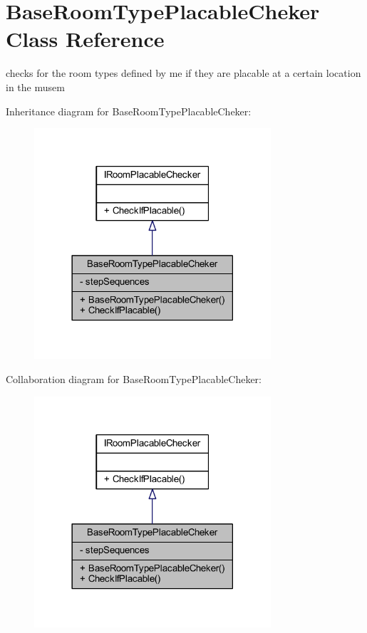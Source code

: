 \hypertarget{class_base_room_type_placable_cheker}{}\section{Base\+Room\+Type\+Placable\+Cheker Class Reference}
\label{class_base_room_type_placable_cheker}


checks for the room types defined by me if they are placable at a certain location in the musem  




Inheritance diagram for Base\+Room\+Type\+Placable\+Cheker\+:
\nopagebreak
\begin{figure}[H]
\begin{center}
\leavevmode
\includegraphics[width=249pt]{class_base_room_type_placable_cheker__inherit__graph}
\end{center}
\end{figure}


Collaboration diagram for Base\+Room\+Type\+Placable\+Cheker\+:
\nopagebreak
\begin{figure}[H]
\begin{center}
\leavevmode
\includegraphics[width=249pt]{class_base_room_type_placable_cheker__coll__graph}
\end{center}
\end{figure}

